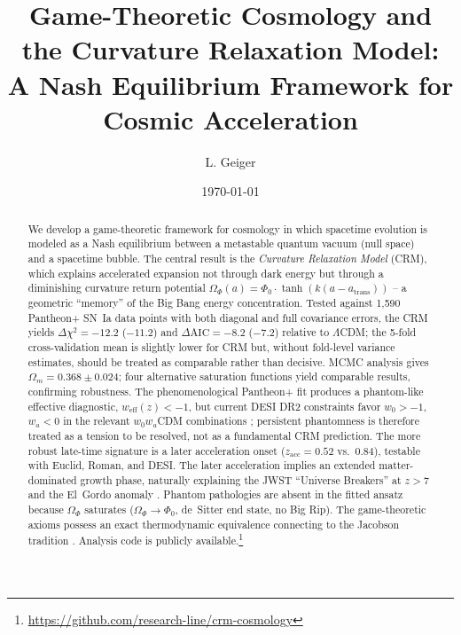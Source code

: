 \documentclass[aps,prd,twocolumn,superscriptaddress,nofootinbib]{revtex4-2}
\begin{document}

\title{Game-Theoretic Cosmology and the Curvature Relaxation Model: A Nash Equilibrium Framework for Cosmic Acceleration}

\author{L. Geiger}

\date{\today}

\begin{abstract}
We develop a game-theoretic framework for cosmology in which spacetime evolution is modeled as a Nash equilibrium between a metastable quantum vacuum (null space) and a spacetime bubble. The central result is the \textit{Curvature Relaxation Model} (CRM), which explains accelerated expansion not through dark energy but through a diminishing curvature return potential $\Omega_\Phi(a) = \Phi_0 \cdot \tanh(k(a - a_{\mathrm{trans}}))$ -- a geometric ``memory'' of the Big Bang energy concentration. Tested against 1,590 Pantheon+ SN~Ia data points \cite{Scolnic2022} with both diagonal and full covariance errors, the CRM yields $\Delta\chi^2 = -12.2$ ($-11.2$) and $\Delta\mathrm{AIC} = -8.2$ ($-7.2$) relative to $\Lambda$CDM; the 5-fold cross-validation mean is slightly lower for CRM but, without fold-level variance estimates, should be treated as comparable rather than decisive. MCMC analysis gives $\Omega_m = 0.368 \pm 0.024$; four alternative saturation functions yield comparable results, confirming robustness. The phenomenological Pantheon+ fit produces a phantom-like effective diagnostic, $w_{\mathrm{eff}}(z)<-1$, but current DESI DR2 constraints favor $w_0>-1$, $w_a<0$ in the relevant $w_0w_a$CDM combinations \cite{DESI2025}; persistent phantomness is therefore treated as a tension to be resolved, not as a fundamental CRM prediction. The more robust late-time signature is a later acceleration onset ($z_{\mathrm{acc}} = 0.52$ vs.\ $0.84$), testable with Euclid, Roman, and DESI. The later acceleration implies an extended matter-dominated growth phase, naturally explaining the JWST ``Universe Breakers'' at $z > 7$ \cite{Labbe2023} and the El~Gordo anomaly \cite{Asencio2023}. Phantom pathologies are absent in the fitted ansatz because $\Omega_\Phi$ saturates ($\Omega_\Phi \to \Phi_0$, de~Sitter end state, no Big Rip). The game-theoretic axioms possess an exact thermodynamic equivalence connecting to the Jacobson tradition \cite{Jacobson1995}. Analysis code is publicly available.\footnote{\url{https://github.com/research-line/crm-cosmology}}
\end{abstract}
\end{document}
